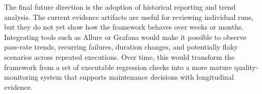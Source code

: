 The final future direction is the adoption of historical reporting and trend analysis. The current evidence artifacts are useful for reviewing individual runs, but they do not yet show how the framework behaves over weeks or months. Integrating tools such as Allure or Grafana would make it possible to observe pass-rate trends, recurring failures, duration changes, and potentially flaky scenarios across repeated executions. Over time, this would transform the framework from a set of executable regression checks into a more mature quality-monitoring system that supports maintenance decisions with longitudinal evidence.

\endgroup
